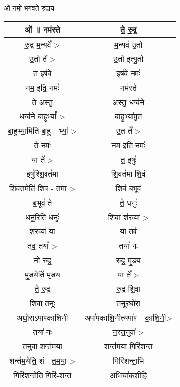 \subsection{}
ओं नमो भगवते रुद्राय
{\centering
\begin{longtable}{|c|c|}
\hline
ओं ॥  नम॑स्ते                & ते॒ रु॒द्र॒\\
\hline
रु॒द्र॒ म॒न्यवे᳚ >               & म॒न्यव॑ उ॒तो\\
\hline
उ॒तो ते᳚ >                  & उ॒तो इत्यु॒तो\\
\hline
त॒ इष॑वे                    & इष॑वे॒ नमः॑\\
\hline
नम॒ इति॒ नमः॑               & नम॑स्ते\\
\hline
ते॒ अ॒स्तु॒                    & अ॒स्तु॒ धन्व॑ने\\
\hline
धन्व॑ने बा॒हुभ्यां᳚ >            & बा॒हुभ्या॑मु॒त\\
\hline
बा॒हुभ्या॒मिति॑ बा॒हु - भ्यां॒ >   & उ॒त ते᳚ >\\
\hline
ते॒ नमः॑                    & नम॒ इति॒ नमः॑\\
\hline
या ते᳚ >                   & त॒ इषुः॑\\
\hline
इषु॑श्शि॒वत॑मा                & शि॒वत॑मा शि॒वं\\
\hline
शि॒वत॒मेति॑ शि॒व - त॒मा॒ >      & शि॒वं ब॒भूव॑\\
\hline
ब॒भूव॑ ते                    & ते॒ धनुः॑\\
\hline
धनु॒रिति॒ धनुः॑               & शि॒वा श॑र॒व्या᳚ >\\
\hline
श॒र॒व्या॑ या                 & या तव॑\\
\hline
तव॒ तया᳚ >                 & तया॑ नः\\
\hline
नो॒ रु॒द्र॒                   & रु॒द्र॒ मृ॒ड॒य॒\\
\hline
मृ॒ड॒येति॑ मृडय                & या ते᳚ >\\
\hline
ते॒ रु॒द्र॒                    & रु॒द्र॒ शि॒वा\\
\hline
शि॒वा त॒नूः                 & त॒नूरघो॑रा\\
\hline
अघो॒राऽपा॑पकाशिनी          & अपा॑पकाशि॒नीत्यपा॑प - का॒शि॒नी॒>\\
\hline
तया॑ नः                   & न॒स्त॒नुवा᳚ >\\
\hline
त॒नुवा॒ शन्त॑मया              & शन्त॑मया॒ गिरि॑शन्त\\
\hline
शन्त॑म॒येति॒ शं - त॒म॒या॒ >       & गिरि॑शन्ता॒भि\\
\hline
गिरि॑श॒न्तेति॒ गिरि॑-श॒न्त॒       & अ॒भिचा॑कशीहि\\

\end{longtable}}
